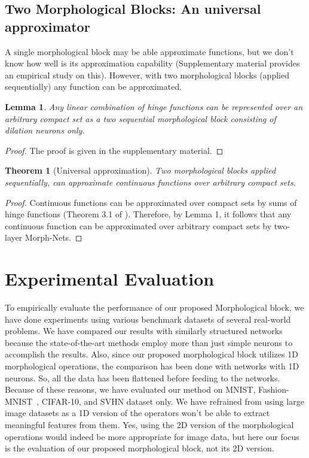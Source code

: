 \documentclass{bmvc2k}
\newtheorem{lemma}{Lemma}
\newtheorem{theorem}{Theorem}
\begin{document}
\subsection{Two Morphological Blocks: An universal approximator}
A single morphological block may be able approximate functions, but we don't know how well is its approximation capability (Supplementary material provides an empirical study on this). However, with two morphological blocks (applied sequentially) any function can be approximated. 
\begin{lemma}
Any linear combination of hinge functions  can be represented over an arbitrary compact set  as a two sequential morphological block consisting of dilation neurons only.
\end{lemma} 
\begin{proof}
The proof is given in the supplementary material.
\end{proof}
\begin{theorem}[Universal approximation]
Two morphological blocks applied sequentially, can approximate continuous functions over arbitrary compact sets.
\end{theorem}
\begin{proof}
Continuous functions can be approximated over compact sets by sums of hinge functions (Theorem 3.1 of \cite{breiman1993hinging}). Therefore, by Lemma 1, it follows that any continuous function can be approximated over arbitrary compact sets by two-layer Morph-Nets.
\end{proof}





\section{Experimental Evaluation}
\label{sec:results}
To empirically evaluate the performance of our proposed Morphological block, we have done experiments using various benchmark datasets of several real-world problems. We have compared our results with similarly structured networks because the state-of-the-art methods employ more than just simple neurons to accomplish the results. Also, since our proposed morphological block utilizes 1D morphological operations, the comparison has been done with networks with 1D neurons. So, all the data has been flattened before feeding to the networks. Because of these reasons, we have evaluated our method on MNIST, Fashion-MNIST~\cite{xiao2017fashion}, CIFAR-10, and SVHN dataset only. We have refrained from using large image datasets as a 1D version of the operators won't be able to extract meaningful features from them. Yes, using the 2D version of the morphological operations would indeed be more appropriate for image data, but here our focus is the evaluation of our proposed morphological block, not its 2D version. 
\end{document}
